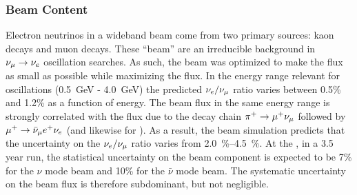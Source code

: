 \subsubsection{Beam \nue Content}
\label{ssec:beam-nue}
Electron neutrinos in a wideband beam come from two primary sources: kaon decays and muon decays. These ``beam'' \nue are an irreducible background in $\nu_\mu \to \nu_e$ oscillation searches. As such, the  beam was optimized to make the \nue flux as small as possible while maximizing the \numu flux. In the energy range relevant for oscillations (\SI{0.5}{GeV} - \SI{4.0}{GeV}) the predicted $\nu_e/\nu_\mu$ ratio varies between 0.5\% and 1.2\% as a function of energy. The beam \nue flux in the same energy range is strongly correlated with the \numu flux due to the decay chain $\pi^+\to\mu^+\nu_\mu$ followed by $\mu^+ \to \bar\nu_\mu{} e^+ \nu_e $ (and likewise for \anue). As a result, the   beam simulation predicts that the uncertainty on the $\nu_e/\nu_\mu$ ratio varies from \SIrange{2.0}{4.5}{\%}. At the  , in a 3.5 year run, the statistical uncertainty on the beam \nue component is expected to be 7\% for the $\nu$ mode beam and 10\% for the $\bar{\nu}$ mode beam. The systematic uncertainty on the beam \nue flux is therefore subdominant, but not negligible.  

